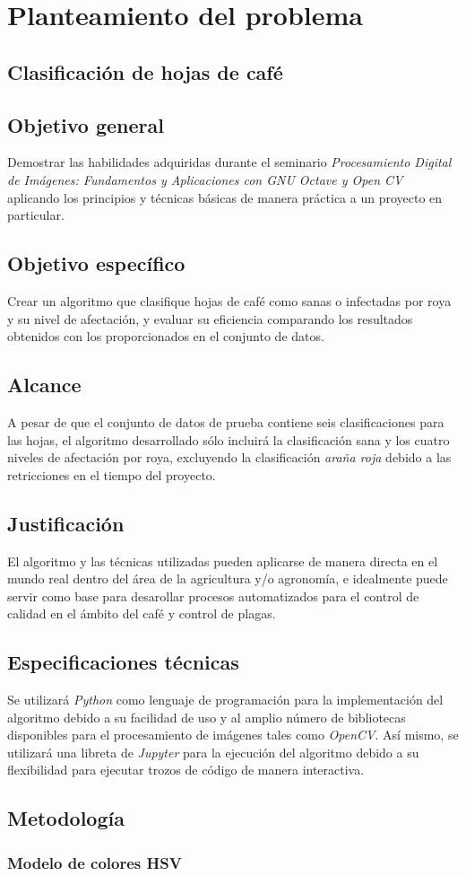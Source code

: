\chapter{Planteamiento del problema}

\section{Clasificación de hojas de café}

\section{Objetivo general}
Demostrar las habilidades adquiridas durante el seminario \textit{Procesamiento Digital de Imágenes: Fundamentos y Aplicaciones con GNU Octave y Open CV} aplicando los principios y técnicas básicas de manera práctica a un proyecto en particular.

\section{Objetivo específico}
Crear un algoritmo que clasifique hojas de café como sanas o infectadas por roya y su nivel de afectación, y evaluar su eficiencia comparando los resultados obtenidos con los proporcionados en el conjunto de datos.

\section{Alcance}
A pesar de que el conjunto de datos de prueba contiene seis clasificaciones para las hojas, el algoritmo desarrollado sólo incluirá la clasificación sana y los cuatro niveles de afectación por roya, excluyendo la clasificación \textit{araña roja} debido a las retricciones en el tiempo del proyecto.

\section{Justificación}
El algoritmo y las técnicas utilizadas pueden aplicarse de manera directa en el mundo real dentro del área de la agricultura y/o agronomía, e idealmente puede servir como base para desarollar procesos automatizados para el control de calidad en el ámbito del café y control de plagas.
 
\section{Especificaciones técnicas}
Se utilizará \textit{Python} como lenguaje de programación para la implementación del algoritmo debido a su facilidad de uso y al amplio número de bibliotecas disponibles para el procesamiento de imágenes tales como \textit{OpenCV}. Así mismo, se utilizará una libreta de \textit{Jupyter} para la ejecución del algoritmo debido a su flexibilidad para ejecutar trozos de código de manera interactiva.

\section{Metodología}

\subsection{Modelo de colores HSV}